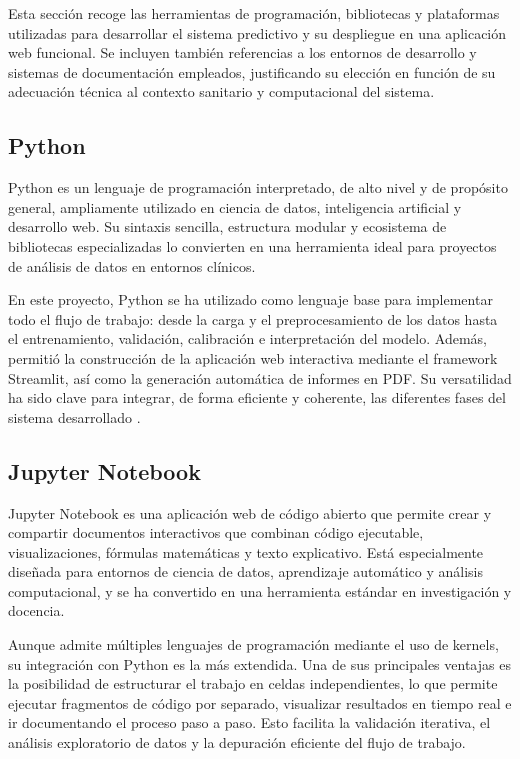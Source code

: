Esta sección recoge las herramientas de programación, bibliotecas y plataformas utilizadas para desarrollar el sistema predictivo y su despliegue en una aplicación web funcional. Se incluyen también referencias a los entornos de desarrollo y sistemas de documentación empleados, justificando su elección en función de su adecuación técnica al contexto sanitario y computacional del sistema.

\subsection{Python}

Python es un lenguaje de programación interpretado, de alto nivel y de propósito general, ampliamente utilizado en ciencia de datos, inteligencia artificial y desarrollo web. Su sintaxis sencilla, estructura modular y ecosistema de bibliotecas especializadas lo convierten en una herramienta ideal para proyectos de análisis de datos en entornos clínicos.

En este proyecto, Python se ha utilizado como lenguaje base para implementar todo el flujo de trabajo: desde la carga y el preprocesamiento de los datos hasta el entrenamiento, validación, calibración e interpretación del modelo. Además, permitió la construcción de la aplicación web interactiva mediante el framework Streamlit, así como la generación automática de informes en PDF. Su versatilidad ha sido clave para integrar, de forma eficiente y coherente, las diferentes fases del sistema desarrollado \cite{python2024}. 


\subsection{Jupyter Notebook}

Jupyter Notebook es una aplicación web de código abierto que permite crear y compartir documentos interactivos que combinan código ejecutable, visualizaciones, fórmulas matemáticas y texto explicativo. Está especialmente diseñada para entornos de ciencia de datos, aprendizaje automático y análisis computacional, y se ha convertido en una herramienta estándar en investigación y docencia.

Aunque admite múltiples lenguajes de programación mediante el uso de kernels, su integración con Python es la más extendida. Una de sus principales ventajas es la posibilidad de estructurar el trabajo en celdas independientes, lo que permite ejecutar fragmentos de código por separado, visualizar resultados en tiempo real e ir documentando el proceso paso a paso. Esto facilita la validación iterativa, el análisis exploratorio de datos y la depuración eficiente del flujo de trabajo.

